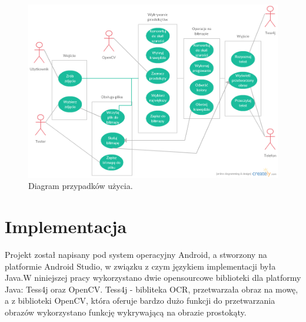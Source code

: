 \documentclass[eng,oneside]{mgr}
\begin{document}
\begin{figure}[htbp]
\centering
\includegraphics[scale=0.5]{usecasediagram.png}
\caption{Diagram przypadków użycia.}
\end{figure}
\chapter{Implementacja}
Projekt został napisany pod system operacyjny Android, a stworzony na platformie Android Studio, w związku z czym językiem implementacji była Java.W niniejszej pracy wykorzystano dwie opensourcowe  biblioteki dla platformy Java: Tess4j oraz OpenCV. Tess4j - bibliteka OCR, przetwarzała obraz na mowę, a z biblioteki OpenCV, która oferuje bardzo dużo funkcji do przetwarzania obrazów wykorzystano funkcję wykrywającą na obrazie prostokąty. 
\end{document}
